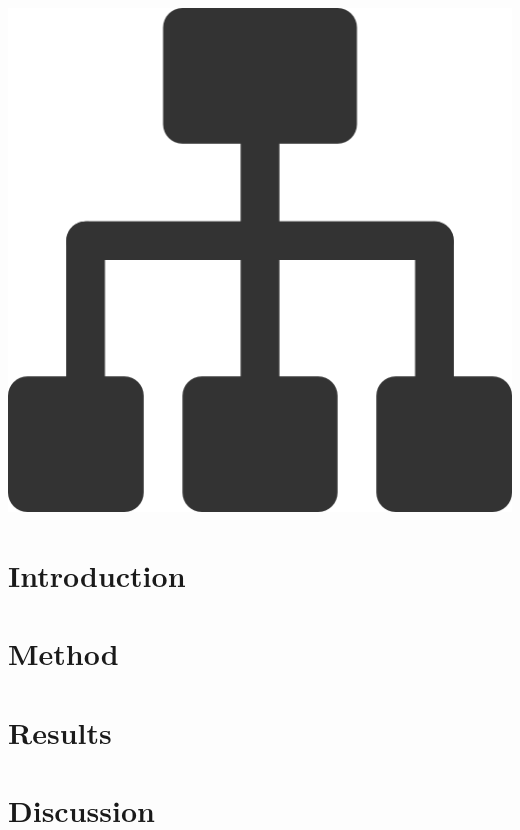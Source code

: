 \documentclass[a4paper,12px]{article}
\begin{document}
\vspace{2cm}
\begin{center}
    \includegraphics[width=(\textwidth/5*3)]{parallel_tasks}
\end{center}
\clearpage

\tableofcontents
\vspace{5mm}


\section{Introduction}

\section{Method}

\section{Results}

\section{Discussion}




%
%
\end{document}
